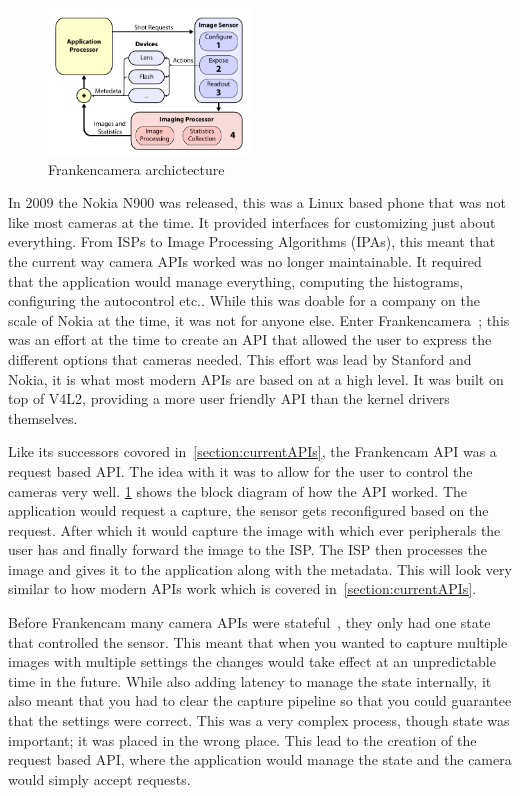 \begin{figure}
    \centering
    \includegraphics[width=0.48\textwidth]{figures/fcam_arch.png}
    \caption{Frankencamera archictecture~\cite{adams2010frankencamera}}
    \label{fig:fcam_api}
\end{figure}

In 2009 the Nokia N900 was released, this was a Linux based phone that was not
like most cameras at the time. It provided interfaces for customizing just
about everything. From ISPs to Image Processing Algorithms (IPAs), this meant
that the current way camera APIs worked was no longer maintainable. It
required that the application would manage everything, computing the
histograms, configuring the autocontrol etc.. While this was doable for a
company on the scale of Nokia at the time, it was not for anyone else. Enter
Frankencamera~\cite{adams2010frankencamera}; this was an effort at the time
to create an API that allowed the user to express the different options that
cameras needed. This effort was lead by Stanford and Nokia, it is what most
modern APIs are based on at a high level. It was built on top of V4L2,
providing a more user friendly API than the kernel drivers themselves.

Like its successors covored in~\cref{section:currentAPIs}, the Frankencam API
was a request based API. The idea with it was to allow for the user to control
the cameras very well. \cref{fig:fcam_api} shows the block diagram of how the
API worked. The application would request a capture, the sensor gets
reconfigured based on the request. After which it would capture the image with
which ever peripherals the user has and finally forward the image to the ISP.
The ISP then processes the image and gives it to the application along with the
metadata. This will look very similar to how modern APIs work which is covered
in~\cref{section:currentAPIs}.

Before Frankencam many camera APIs were stateful~\cite{experimentalCompPhot},
they only had one state that controlled the sensor. This meant that when you
wanted to capture multiple images with multiple settings the changes would take
effect at an unpredictable time in the future. While also adding latency to
manage the state internally, it also meant that you had to clear the capture
pipeline so that you could guarantee that the settings were correct. This was a
very complex process, though state was important; it was placed in the wrong
place. This lead to the creation of the request based API, where the
application would manage the state and the camera would simply accept requests.

